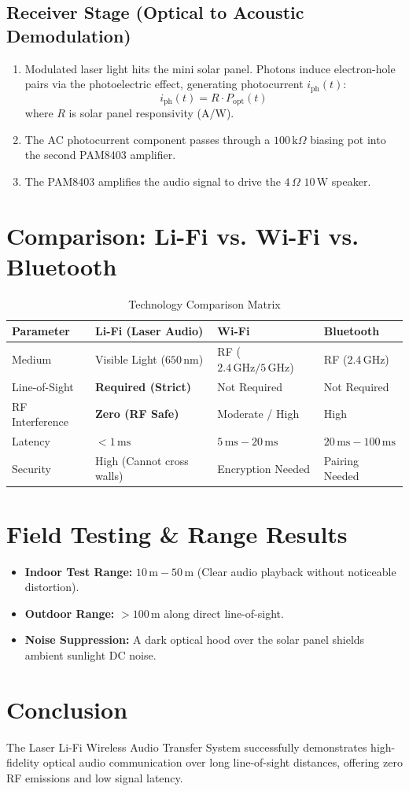\documentclass[11pt,a4paper]{article}
\begin{document}
\subsection{Receiver Stage (Optical to Acoustic Demodulation)}
\begin{enumerate}
    \item Modulated laser light hits the mini solar panel. Photons induce electron-hole pairs via the photoelectric effect, generating photocurrent $i_{\text{ph}}(t)$:
    \begin{equation}
    i_{\text{ph}}(t) = R \cdot P_{\text{opt}}(t)
    \end{equation}
    where $R$ is solar panel responsivity ($\text{A/W}$).
    \item The AC photocurrent component passes through a $100\,\text{k}\Omega$ biasing pot into the second PAM8403 amplifier.
    \item The PAM8403 amplifies the audio signal to drive the $4\,\Omega$ $10\,\text{W}$ speaker.
\end{enumerate}

\section{Comparison: Li-Fi vs. Wi-Fi vs. Bluetooth}
\begin{table}[h!]
\centering
\caption{Technology Comparison Matrix}
\vspace{0.5em}
\begin{tabular}{@{}l l l l@{}}
\toprule
\textbf{Parameter} & \textbf{Li-Fi (Laser Audio)} & \textbf{Wi-Fi} & \textbf{Bluetooth} \\
\midrule
Medium & Visible Light ($650\,\text{nm}$) & RF ($2.4\,\text{GHz} / 5\,\text{GHz}$) & RF ($2.4\,\text{GHz}$) \\
Line-of-Sight & \textbf{Required (Strict)} & Not Required & Not Required \\
RF Interference & \textbf{Zero (RF Safe)} & Moderate / High & High \\
Latency & \textbf{$< 1\,\text{ms}$} & $5\,\text{ms} - 20\,\text{ms}$ & $20\,\text{ms} - 100\,\text{ms}$ \\
Security & High (Cannot cross walls) & Encryption Needed & Pairing Needed \\
\bottomrule
\end{tabular}
\end{table}

\section{Field Testing \& Range Results}
\begin{itemize}
    \item \textbf{Indoor Test Range:} $10\,\text{m} - 50\,\text{m}$ (Clear audio playback without noticeable distortion).
    \item \textbf{Outdoor Range:} $> 100\,\text{m}$ along direct line-of-sight.
    \item \textbf{Noise Suppression:} A dark optical hood over the solar panel shields ambient sunlight DC noise.
\end{itemize}

\section{Conclusion}
The Laser Li-Fi Wireless Audio Transfer System successfully demonstrates high-fidelity optical audio communication over long line-of-sight distances, offering zero RF emissions and low signal latency.
\end{document}
